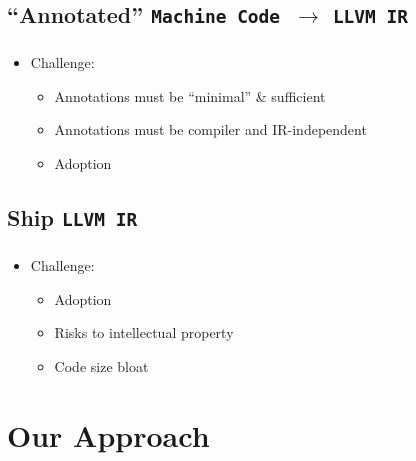 \documentclass[mathserif,10pt]{beamer}
\newcommand{\cmt}[1]{}
\newcommand{\LIR}{{\tt LLVM IR}}
\newcommand{\MC}{{\tt Machine Code}}
\begin{document}
  \subsection{``Annotated'' \MC \ $\rightarrow$ \LIR}
  \frame
  {
    \frametitle{\subsecname}
    \begin{itemize}
      \item Challenge: 
        \begin{itemize}
          \item Annotations must be ``minimal'' \& sufficient
          \item Annotations must be compiler and IR-independent
          \item Adoption
        \end{itemize}
    \end{itemize}

\cmt{ Another challenge is that the annotations should be compiler- and
  IR-independent, e.g., a non-LLVM commercial compiler such as Windows Visual
    C++ or Intel’s ICC should be able to produce them 
    
    * Add another bullet
    here saying that we will learn from our experience with the first approach
    before we decide what the annotations need to be
}

  }

  \subsection{Ship \LIR}
  \frame
  {
    \frametitle{\subsecname}
    \begin{itemize}
      \item Challenge:
        \begin{itemize}
          \item Adoption
          \item Risks to intellectual property
          \item Code size bloat
        \end{itemize}
    \end{itemize}
  }

\section{Our Approach}
\end{document}
